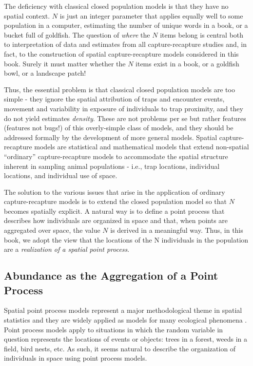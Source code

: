 The deficiency with classical closed population models is that they
have no spatial context. $N$ is just an integer parameter that applies
equally well to some population in a computer, estimating the number
of unique words in a book, or a bucket full of goldfish.  The question
of {\it where} the $N$ items belong is central both to interpretation
of data and estimates from all capture-recapture studies and, in fact,
to the construction of spatial capture-recapture models considered in
this book.  Surely it must matter whether the $N$ items exist 
in a book, or a goldfish bowl, or a landscape patch!

Thus, the essential problem is that classical closed population models
are too simple - they ignore the spatial attribution of traps and
encounter events, movement and variability in exposure of individuals
to trap proximity, and they do not yield estimates {\it density}.
These are not problems per se but rather features (features
not bugs!) of this overly-simple class of models, and they 
should be addressed formally by the development of
more general models.  Spatial capture-recapture models are
statistical and mathematical models that extend non-spatial
``ordinary'' capture-recapture models to accommodate the spatial
structure inherent in sampling animal populations - i.e., trap
locations, individual locations, and individual use of space.

The solution to the various issues that arise in the application of
ordinary capture-recapture models is to extend the closed population
model so that $N$ becomes spatially explicit.  A natural way is to
define a point process \citep{efford:2004} that describes how
individuals are organized in space and that, when points are
aggregated over space, the value $N$ is derived in a meaningful way.
Thus, in this book, we adopt the view that the locations of the N
individuals in the population are a {\it realization of a spatial
  point process}.


\subsection{Abundance as the Aggregation of a Point Process}

Spatial point process models represent a major methodological theme in
spatial statistics \citep[][ch. xyz]{cressie:1992} and they are
widely applied as models for many ecological phenomena 
\citep{stoyan_penttinen:2000,illian:2008}. Point process models apply to
situations in which the random variable in question represents the
locations of events or objects: trees in a forest, weeds in a field,
bird nests, etc.  As such, it seems natural to describe the
organization of individuals in space using point process models. 

